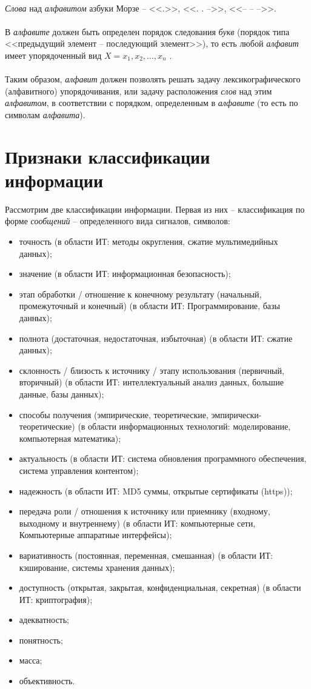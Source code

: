 \\\emph{Слова} над \emph{алфавитом} азбуки Морзе – <<.>>, <<. . –>>, <<– – –>>.\\
\\В  \emph{алфавите} должен быть определен порядок следования \emph{букв} (порядок типа <<предыдущий элемент – последующий элемент>>), то есть любой \emph{алфавит} имеет упорядоченный вид $X = {x_1, x_2, …, x_n}$ .\\
\\Таким образом, \emph{алфавит} должен позволять решать задачу лексикографического (алфавитного) упорядочивания, или задачу расположения \emph{слов} над этим \emph{алфавитом}, в соответствии с порядком, определенным в \emph{алфавите} (то есть по символам \emph{алфавита}).

\section{Признаки классификации информации}

Рассмотрим две классификации информации. Первая из них -- классификация по форме \emph{сообщений} -- определенного вида сигналов, символов:
\begin{itemize}
  \item точность (в области ИТ: методы округления, сжатие мультимедийных данных);
  \item значение (в области ИТ: информационная безопасность);
  \item этап обработки / отношение к конечному результату (начальный, промежуточный и конечный) (в области ИТ: Программирование, базы данных);
  \item полнота (достаточная, недостаточная, избыточная) (в области ИТ: сжатие данных);
  \item склонность / близость к источнику / этапу использования (первичный, вторичный) (в области ИТ: интеллектуальный анализ данных, большие данные, базы данных);
  \item способы получения (эмпирические, теоретические, эмпирически-теоретические) (в области информационных технологий: моделирование, компьютерная математика);
  \item актуальность (в области ИТ: система обновления программного обеспечения, система управления контентом);
  \item надежность (в области ИТ: MD5 суммы, открытые сертификаты (https));
  \item передача роли / отношения к источнику или приемнику (входному, выходному и внутреннему) (в области ИТ: компьютерные сети, Компьютерные аппаратные интерфейсы);
  \item вариативность (постоянная, переменная, смешанная) (в области ИТ: кэширование, системы хранения данных);
  \item доступность (открытая, закрытая, конфиденциальная, секретная) (в области ИТ: криптография);
  \item адекватность;
  \item понятность;
  \item масса;
  \item объективность.
\end{itemize}

